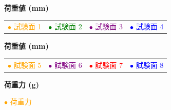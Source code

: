 \documentclass[UTF8,10pt,a4paper,fontset=fandol]{ctexart}
\begin{document}

\newpage

\begin{center}
\begin{minipage}[t]{0.47\linewidth}
\centering
\textbf{荷重値 (mm)}

\vspace{2mm}
\begin{tabular}{c@{\quad}c@{\quad}c@{\quad}c}
\textcolor{orange}{\(\bullet\) 試験面 1} &
\textcolor{green}{\(\bullet\) 試験面 2} &
\textcolor{purple}{\(\bullet\) 試験面 3} &
\textcolor{blue}{\(\bullet\) 試験面 4}
\end{tabular}

\vspace{2mm}
\end{minipage}
\hfill
\begin{minipage}[t]{0.47\linewidth}
\centering
\textbf{荷重値 (mm)}

\vspace{2mm}
\begin{tabular}{c@{\quad}c@{\quad}c@{\quad}c}
\textcolor{orange}{\(\bullet\) 試験面 5} &
\textcolor{purple}{\(\bullet\) 試験面 6} &
\textcolor{red}{\(\bullet\) 試験面 7} &
\textcolor{blue}{\(\bullet\) 試験面 8}
\end{tabular}

\vspace{2mm}
\end{minipage}

\vspace{8mm}

\begin{minipage}{0.94\linewidth}
\centering
\textbf{荷重力 (g)}

\vspace{2mm}
\hfill \textcolor{orange}{\(\bullet\) 荷重力}\hfill\null

\vspace{2mm}
\end{minipage}
\end{center}
\end{document}
